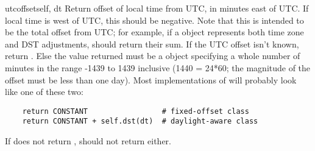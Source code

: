 \begin{methoddesc}{utcoffset}{self, dt}
  Return offset of local time from UTC, in minutes east of UTC.  If
  local time is west of UTC, this should be negative.  Note that this
  is intended to be the total offset from UTC; for example, if a
   object represents both time zone and DST adjustments,
   should return their sum.  If the UTC offset
  isn't known, return .  Else the value returned must be
  a  object specifying a whole number of minutes in the
  range -1439 to 1439 inclusive (1440 = 24*60; the magnitude of the offset
  must be less than one day).  Most implementations of
   will probably look like one of these two:

\begin{verbatim}
    return CONSTANT                 # fixed-offset class
    return CONSTANT + self.dst(dt)  # daylight-aware class
\end{verbatim}

    If  does not return ,
     should not return  either.
\end{methoddesc}


